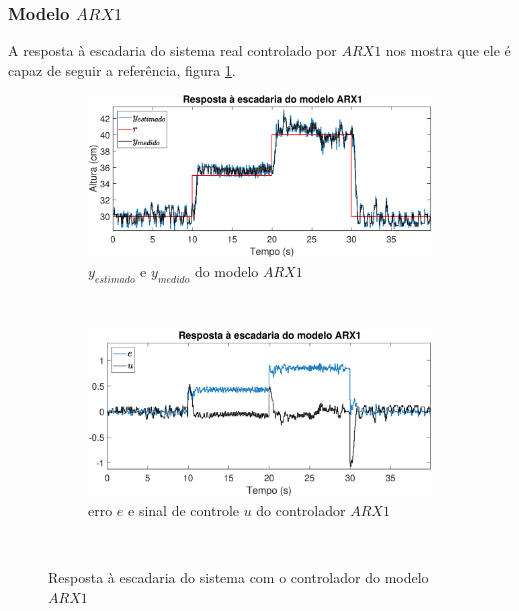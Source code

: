 \subsubsection{Modelo $ARX1$}
A resposta à escadaria do sistema real controlado por $ARX1$ nos mostra que ele é capaz de seguir a referência, figura \ref{fig:stairrarx1y}.

\begin{figure}[htb]
	\centering
	\begin{subfigure}[t]{0.48\textwidth}
		\includegraphics[width=1\linewidth]{stairrarx1y}
		\caption[$y_{estimado}$ e $y_{medido}$ do modelo $ARX1$]{$y_{estimado}$ e $y_{medido}$ do modelo $ARX1$}
		\label{fig:stairrarx1y}
	\end{subfigure}
	~ %
	\begin{subfigure}[t]{0.48\textwidth}
		\includegraphics[width=1\linewidth]{stairrarx1e}
		\caption[erro $e$ e sinal de controle $u$ do controlador $ARX1$]{erro $e$ e sinal de controle $u$ do controlador $ARX1$}
		\label{fig:stairrarx1e}
	\end{subfigure}
	~ %
	
	\caption{Resposta à escadaria do sistema com o controlador do modelo $ARX1$}\label{fig:stairrarx1}
\end{figure}

